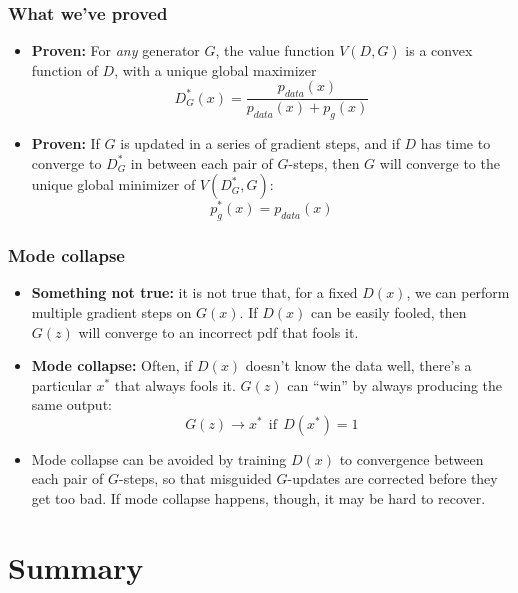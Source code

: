 \documentclass{beamer}
\begin{document}
\begin{frame}
  \frametitle{What we've proved}

  \begin{itemize}
  \item {\bf Proven:} For {\em any} generator $G$, the value
    function $V(D,G)$ is a convex function of $D$, with a unique global
    maximizer
    \[
    D^*_G(x) = \frac{p_{data}(x)}{p_{data}(x)+p_g(x)}
    \]
  \item {\bf Proven:} If $G$ is updated in a series of gradient steps,
    and if $D$ has time to converge to $D^*_G$ in between each pair of
    $G$-steps, then $G$ will converge to the unique global minimizer
    of $V(D^*_G,G)$:
    \[
    p_g^*(x) = p_{data}(x)
    \]
  \end{itemize}
\end{frame}

\begin{frame}
  \frametitle{Mode collapse}

  \begin{itemize}
  \item {\bf Something not true:} it is not true that, for a fixed
    $D(x)$, we can perform multiple gradient steps on $G(x)$.  If
    $D(x)$ can be easily fooled, then  $G(z)$ will converge to an
    incorrect pdf that fools it.
  \item {\bf Mode collapse:} Often, if $D(x)$ doesn't know the data
    well, there's a particular $x^*$ that always fools it.  $G(z)$ can
    ``win'' by always producing the same output:
    \begin{displaymath}
      G(z)\rightarrow x^* ~~\mbox{if}~~D(x^*)=1
    \end{displaymath}
  \item Mode collapse can be avoided by training $D(x)$ to convergence
    between each pair of $G$-steps, so that misguided $G$-updates are
    corrected before they get too bad.  If mode collapse happens,
    though, it may be hard to recover.
  \end{itemize}
\end{frame}
  
\section{Summary}
\setcounter{subsection}{1}
\end{document}
